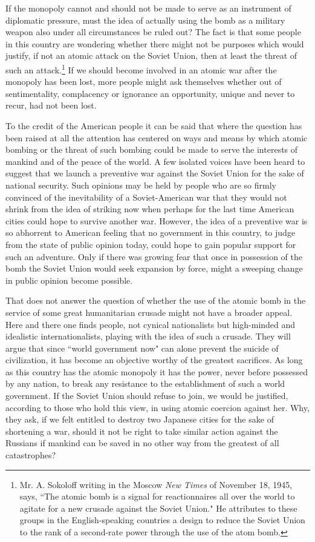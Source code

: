 If the monopoly cannot and should not be made to serve as an instrument of diplomatic pressure, must the idea of actually using the bomb as a military weapon also under all circumstances be ruled out? The fact is that some people in this country are wondering whether there might not be purposes which would justify, if not an atomic attack on the Soviet Union, then at least the threat of such an attack.\footnote{Mr. A. Sokoloff writing in the Moscow \textit{New Times} of November 18, 1945, says, ``The atomic bomb is a signal for reactionnaires all over the world to agitate for a new crusade against the Soviet Union." He attributes to these groups in the English-speaking countries a design to reduce the Soviet Union to the rank of a second-rate power through the use of the atom bomb.} If we should become involved in an atomic war after the monopoly has been lost, more people might ask themselves whether out of sentimentality, complacency or ignorance an opportunity, unique and never to recur, had not been lost.

To the credit of the American people it can be said that where the question has been raised at all the attention has centered on ways and means by which atomic bombing or the threat of such bombing could be made to serve the interests of mankind and of the peace of the world. A few isolated voices have been heard to suggest that we launch a preventive war against the Soviet Union for the sake of national security. Such opinions may be held by people who are so firmly convinced of the inevitability of a Soviet-American war that they would not shrink from the idea of striking now when perhaps for the last time American cities could hope to survive another war. However, the idea of a preventive war is so abhorrent to American feeling that no government in this country, to judge from the state of public opinion today, could hope to gain popular support for such an adventure. Only if there was growing fear that once in possession of the bomb the Soviet Union would seek expansion by force, might a sweeping change in public opinion become possible.

That does not answer the question of whether the use of the atomic bomb in the service of some great humanitarian crusade might not have a broader appeal. Here and there one finds people, not cynical nationalists but high-minded and idealistic internationalists, playing with the idea of such a crusade. They will argue that since ``world government now" can alone prevent the suicide of civilization, it has become an objective worthy of the greatest sacrifices. As long as this country has the atomic monopoly it has the power, never before possessed by any nation, to break any resistance to the establishment of such a world government. If the Soviet Union should refuse to join, we would be justified, according to those who hold this view, in using atomic coercion against her. Why, they ask, if we felt entitled to destroy two Japanese cities for the sake of shortening a war, should it not be right to take similar action against the Russians if mankind can be saved in no other way from the greatest of all catastrophes?

